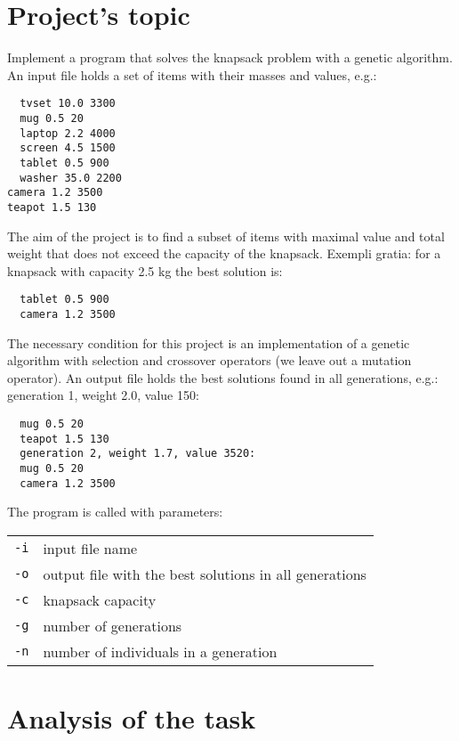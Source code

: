 \documentclass[12pt,a4paper,twoside]{article}
\let\oldmarginpar\marginpar
\renewcommand\marginpar[1]{%
  {\linespread{0.85}\normalfont\scriptsize%
\oldmarginpar[\hspace{1cm}\begin{minipage}{3cm}\raggedleft\scriptsize\color{black}\textsf{#1}\end{minipage}]%
{\hspace{0cm}\begin{minipage}{3cm}\raggedright\scriptsize\color{black}\textsf{#1}\end{minipage}}%
}%
}
\begin{document}
\section{Project's topic}
Implement a program that solves the knapsack problem with a genetic algorithm. An input file holds a set of
items with their masses and values, e.g.:%
\begin{verbatim}
  tvset 10.0 3300
  mug 0.5 20
  laptop 2.2 4000
  screen 4.5 1500
  tablet 0.5 900
  washer 35.0 2200
camera 1.2 3500
teapot 1.5 130
\end{verbatim}
The aim of the project is to find a subset of items with maximal value and total weight that does not exceed the
capacity of the knapsack. Exempli gratia: for a knapsack with capacity 2.5 kg the best solution is:
\begin{verbatim}
  tablet 0.5 900
  camera 1.2 3500
\end{verbatim}
The necessary condition for this project is an implementation of a genetic algorithm with selection and
crossover operators (we leave out a mutation operator). An output file holds the best solutions found in all
generations, e.g.:
generation 1, weight 2.0, value 150:
\begin{verbatim}
  mug 0.5 20
  teapot 1.5 130
  generation 2, weight 1.7, value 3520:
  mug 0.5 20
  camera 1.2 3500
\end{verbatim}
The program is called with parameters: 
\begin{tabular}{ll}
\texttt{-i}  & input file name\\
\texttt{-o}  & output file with the best solutions in all generations\\
\texttt{-c}  & knapsack capacity\\
\texttt{-g}  & number of generations\\
\texttt{-n}  & number of individuals in a generation\\
\end{tabular}

\section{Analysis of the task}
\end{document}
